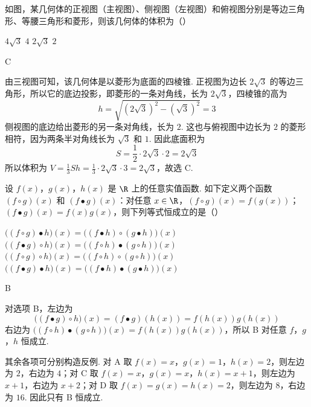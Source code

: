 \begin{problem}
如图，某几何体的正视图（主视图）、侧视图（左视图）和俯视图分别是等边三角形、等腰三角形和菱形，则该几何体的体积为（\quad）


\choices
    {\(4\sqrt{3}\)}
    {\(4\)}
    {\(2 \sqrt{3}\)}
    {\(2\)}
\end{problem}

\begin{answer}
C
\end{answer}

\begin{solution}
由三视图可知，该几何体是以菱形为底面的四棱锥. 正视图为边长 \(2\sqrt{3}\) 的等边三角形，所以它的底边投影，即菱形的一条对角线，长为 \(2\sqrt{3}\)，四棱锥的高为
\[
h=\sqrt{(2\sqrt{3})^2-(\sqrt{3})^2}=3
\]
侧视图的底边给出菱形的另一条对角线，长为 \(2\). 这也与俯视图中边长为 \(2\) 的菱形相符，因为两条半对角线长为 \(\sqrt{3}\) 和 \(1\). 因此底面积为
\[
S=\frac{1}{2}\cdot2\sqrt{3}\cdot2=2\sqrt{3}
\]
所以体积为 \(V=\frac{1}{3}Sh=\frac{1}{3}\cdot2\sqrt{3}\cdot3=2\sqrt{3}\)，故选 C.
\end{solution}

\begin{problem}
设 \(f(x)\)，\(g(x)\)，\(h(x)\) 是 \(\R\) 上的任意实值函数. 如下定义两个函数 \((f \circ g)(x)\) 和 \((f \bullet g)(x)\)：对任意 \(x \in \R\)，\((f \circ g)(x) = f(g(x))\)；\((f \bullet g)(x) = f(x)g(x)\)，则下列等式恒成立的是（\quad）

\choices
    {\(\big((f\circ g)\bullet h\big)(x) = \big((f\bullet h)\circ (g\bullet h)\big)(x)\)}
    {\(\big((f\bullet g)\circ h\big)(x) = \big((f\circ h)\bullet (g\circ h)\big)(x)\)}
    {\(\big((f\circ g)\circ h\big)(x) = \big((f\circ h)\circ (g\circ h)\big)(x)\)}
    {\(\big((f\bullet g)\bullet h\big)(x) = \big((f\bullet h)\bullet (g\bullet h)\big)(x)\)}
\end{problem}

\begin{answer}
B
\end{answer}

\begin{solution}
对选项 B，左边为
\[
\big((f\bullet g)\circ h\big)(x)=(f\bullet g)(h(x))=f(h(x))g(h(x))
\]
右边为 \(\big((f\circ h)\bullet(g\circ h)\big)(x)=f(h(x))g(h(x))\)，所以 B 对任意 \(f\)，\(g\)，\(h\) 恒成立.

其余各项可分别构造反例. 对 A 取 \(f(x)=x\)，\(g(x)=1\)，\(h(x)=2\)，则左边为 \(2\)，右边为 \(4\)；对 C 取 \(f(x)=x\)，\(g(x)=x\)，\(h(x)=x+1\)，则左边为 \(x+1\)，右边为 \(x+2\)；对 D 取 \(f(x)=g(x)=h(x)=2\)，则左边为 \(8\)，右边为 \(16\). 因此只有 B 恒成立.
\end{solution}

